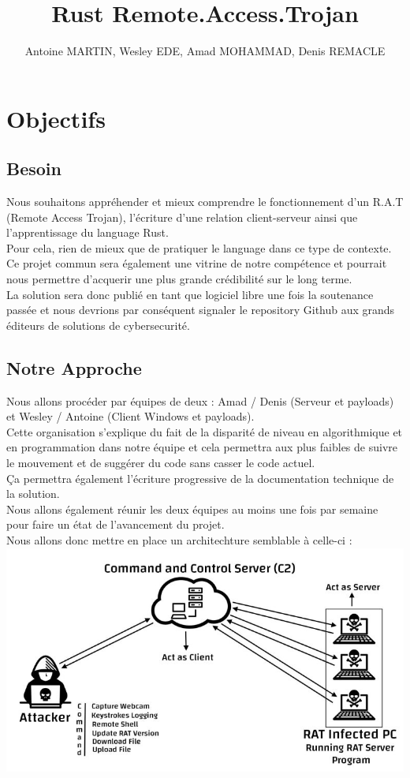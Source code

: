 \documentclass[a4paper]{article}
\title{Rust Remote.Access.Trojan}
\author{Antoine MARTIN, Wesley EDE, Amad MOHAMMAD, Denis REMACLE}
\begin{document}
   \maketitle
   \newpage
   \section{Objectifs}
   \subsection{Besoin}
Nous souhaitons appréhender et mieux comprendre le fonctionnement d'un R.A.T (Remote Access Trojan), l'écriture d'une relation client-serveur ainsi que l'apprentissage du language Rust.\\
Pour cela, rien de mieux que de pratiquer le language dans ce type de contexte.
\bigskip
\\
Ce projet commun sera également une vitrine de notre compétence et pourrait nous permettre d'acquerir une plus grande crédibilité sur le long terme.\\
La solution sera donc publié en tant que logiciel libre une fois la soutenance passée et nous devrions par conséquent signaler le repository Github aux grands éditeurs de solutions de cybersecurité.
   \subsection{Notre Approche}
Nous allons procéder par équipes de deux : Amad / Denis (Serveur et payloads) et Wesley / Antoine (Client Windows et payloads).\\
Cette organisation s'explique du fait de la disparité de niveau en algorithmique et en programmation dans notre équipe et cela permettra aux plus faibles de suivre le mouvement et de suggérer du code sans casser le code actuel.
\bigskip
\\
Ça permettra également l'écriture progressive de la documentation technique de la solution.\\
Nous allons également réunir les deux équipes au moins une fois par semaine pour faire un état de l'avancement du projet.
\bigskip
\\
Nous allons donc mettre en place un architechture semblable à celle-ci : \\
\includegraphics[scale=.5]{Schema.jpg}
\newpage
\end{document}
